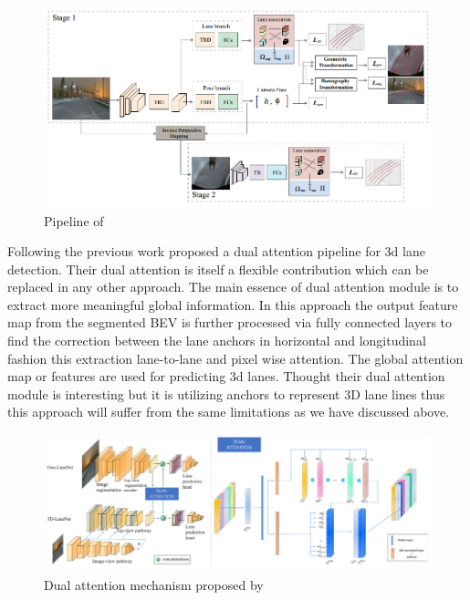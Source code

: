  \begin{figure}[h]
    \centering
    \includegraphics[width=\textwidth]{images/3dLane_camera_pose_pipeline.png}
    \caption{Pipeline of \cite{DBLP:journals/corr/abs-2112-15351}}
    \end{figure}

Following the previous work \cite{9506296} proposed a dual attention pipeline for 3d lane detection. Their dual attention is itself a flexible contribution which can be replaced in any other approach. The main essence of dual attention module is to extract more meaningful global information. In this approach the output feature map from the segmented BEV is further processed via fully connected layers to find the correction between the lane anchors in horizontal and longitudinal fashion this extraction lane-to-lane and pixel wise attention. The global attention map or features are used for predicting 3d lanes. Thought their dual attention module is interesting but it is utilizing anchors to represent 3D lane lines thus this approach will suffer from the same limitations as we have discussed above. 

 \begin{figure}[h]
    \centering
\includegraphics[width=12cm, height=4cm]{images/dual_attention_pipeline.png}
    \caption{Dual attention mechanism  proposed by  \cite{9506296}}
    \end{figure}

